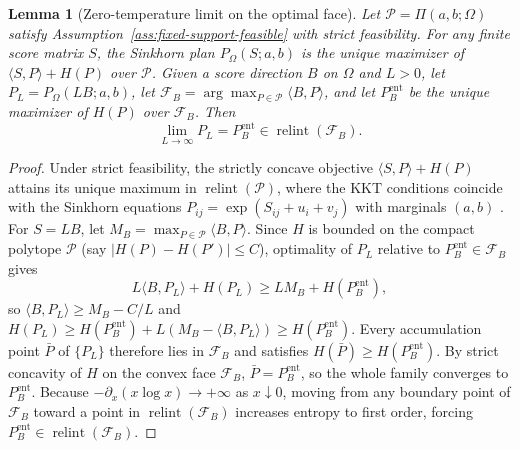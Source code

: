 \documentclass[10pt]{article}
\newtheorem{lemma}{Lemma}
\begin{document}
\begin{lemma}[Zero-temperature limit on the optimal face]
\label{lem:zero-temperature-limit}
Let $\mathcal{P} = \Pi(a,b;\Omega)$ satisfy Assumption~\ref{ass:fixed-support-feasible} with strict feasibility. For any finite score matrix $S$, the Sinkhorn plan $P_\Omega(S;a,b)$ is the unique maximizer of $\langle S, P\rangle + H(P)$ over $\mathcal{P}$. Given a score direction $B$ on $\Omega$ and $L > 0$, let $P_L = P_\Omega(LB;a,b)$, let $\mathcal{F}_B = \arg\max_{P\in\mathcal{P}} \langle B, P\rangle$, and let $P_B^{\mathrm{ent}}$ be the unique maximizer of $H(P)$ over $\mathcal{F}_B$. Then
\[
  \lim_{L\to\infty} P_L = P_B^{\mathrm{ent}} \in \operatorname{relint}(\mathcal{F}_B).
\]
\end{lemma}

\begin{proof}
Under strict feasibility, the strictly concave objective $\langle S, P\rangle + H(P)$ attains its unique maximum in $\operatorname{relint}(\mathcal{P})$, where the KKT conditions coincide with the Sinkhorn equations $P_{ij} = \exp(S_{ij}+u_i+v_j)$ with marginals $(a,b)$ \citep{peyre2019computational}. For $S = LB$, let $M_B = \max_{P\in\mathcal{P}} \langle B, P\rangle$. Since $H$ is bounded on the compact polytope $\mathcal{P}$ (say $|H(P) - H(P')| \le C$), optimality of $P_L$ relative to $P_B^{\mathrm{ent}} \in \mathcal{F}_B$ gives
\[
  L\langle B, P_L\rangle + H(P_L) \ge L M_B + H(P_B^{\mathrm{ent}}),
\]
so $\langle B, P_L\rangle \ge M_B - C/L$ and $H(P_L) \ge H(P_B^{\mathrm{ent}}) + L(M_B - \langle B, P_L\rangle) \ge H(P_B^{\mathrm{ent}})$. Every accumulation point $\bar P$ of $\{P_L\}$ therefore lies in $\mathcal{F}_B$ and satisfies $H(\bar P) \ge H(P_B^{\mathrm{ent}})$. By strict concavity of $H$ on the convex face $\mathcal{F}_B$, $\bar P = P_B^{\mathrm{ent}}$, so the whole family converges to $P_B^{\mathrm{ent}}$. Because $-\partial_x(x\log x) \to +\infty$ as $x \downarrow 0$, moving from any boundary point of $\mathcal{F}_B$ toward a point in $\operatorname{relint}(\mathcal{F}_B)$ increases entropy to first order, forcing $P_B^{\mathrm{ent}} \in \operatorname{relint}(\mathcal{F}_B)$.
\end{proof}
\end{document}

